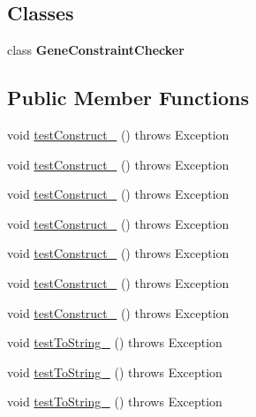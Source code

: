 \subsection*{Classes}
\begin{DoxyCompactItemize}
\item 
class {\bfseries Gene\-Constraint\-Checker}
\end{DoxyCompactItemize}
\subsection*{Public Member Functions}
\begin{DoxyCompactItemize}
\item 
void \hyperlink{classorg_1_1jgap_1_1impl_1_1_fixed_binary_gene_test_ae026b833286bd09c2dd6612fa9e62ac6}{test\-Construct\-\_} ()  throws Exception 
\item 
void \hyperlink{classorg_1_1jgap_1_1impl_1_1_fixed_binary_gene_test_a0831366f5dc49fc1ed92085a58562230}{test\-Construct\-\_} ()  throws Exception 
\item 
void \hyperlink{classorg_1_1jgap_1_1impl_1_1_fixed_binary_gene_test_a129261c68eccfad28eccd2053411c5bb}{test\-Construct\-\_} ()  throws Exception 
\item 
void \hyperlink{classorg_1_1jgap_1_1impl_1_1_fixed_binary_gene_test_a6f51e95026d94c6cc8aea3ebb19739f8}{test\-Construct\-\_} ()  throws Exception 
\item 
void \hyperlink{classorg_1_1jgap_1_1impl_1_1_fixed_binary_gene_test_aa2c9116eec0ebd318b8bd5d65ae84237}{test\-Construct\-\_} ()  throws Exception 
\item 
void \hyperlink{classorg_1_1jgap_1_1impl_1_1_fixed_binary_gene_test_a2082ec21fd7f5723847c5f157deb5a8f}{test\-Construct\-\_} ()  throws Exception 
\item 
void \hyperlink{classorg_1_1jgap_1_1impl_1_1_fixed_binary_gene_test_a9506a4010721763e68811a5c3328fad4}{test\-Construct\-\_} ()  throws Exception 
\item 
void \hyperlink{classorg_1_1jgap_1_1impl_1_1_fixed_binary_gene_test_a1b54ccae5dcffc2be5b9df801b276d1c}{test\-To\-String\-\_} ()  throws Exception 
\item 
void \hyperlink{classorg_1_1jgap_1_1impl_1_1_fixed_binary_gene_test_a0d53eeb1d5bbf8a15f4c85b30c72364b}{test\-To\-String\-\_} ()  throws Exception 
\item 
void \hyperlink{classorg_1_1jgap_1_1impl_1_1_fixed_binary_gene_test_a3795203a4324069a9e828f86761d8214}{test\-To\-String\-\_} ()  throws Exception 

\end{DoxyCompactItemize}
